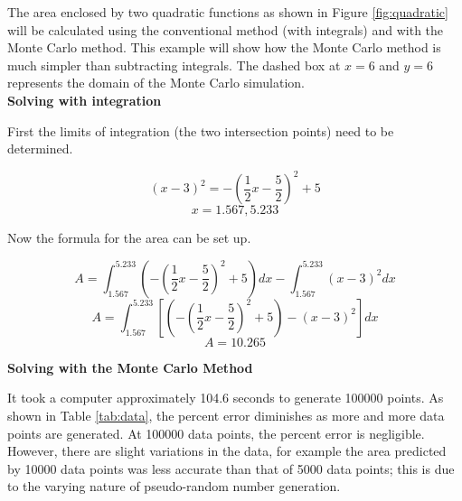 \documentclass[10pt, letterpaper]{article}
\begin{document}
  The area enclosed by two quadratic functions as shown in Figure \ref{fig:quadratic} will be calculated using the conventional method (with
  integrals) and with the Monte Carlo method. This example will show how the Monte Carlo method is much simpler than subtracting
  integrals. The dashed box at $x=6$ and $y=6$ represents the domain of the Monte Carlo simulation. \\

  \textbf{Solving with integration}

  First the limits of integration (the two intersection points) need to be determined.

  \[ (x-3)^2 = -\left(\frac{1}{2}x - \frac{5}{2} \right)^2 + 5 \]
  \[ x = 1.567, 5.233 \]

  Now the formula for the area can be set up.

  \[ A = \int_{1.567}^{5.233} \left( -\left(\frac{1}{2}x-\frac{5}{2} \right)^2 + 5 \right) dx - \int_{1.567}^{5.233} (x-3)^2 dx \]
  \[ A = \int_{1.567}^{5.233} [(-\left(\frac{1}{2}x-\frac{5}{2} \right)^2 + 5) - (x-3)^2]dx \]
  \[ \boxed{A = 10.265} \]

  \textbf{Solving with the Monte Carlo Method}

  It took a computer approximately 104.6 seconds to generate 100000 points. As shown in Table \ref{tab:data}, the percent error diminishes
  as more and more data points are generated. At 100000 data points, the percent error is negligible. However, there are slight variations
  in the data, for example the area predicted by 10000 data points was less accurate than that of 5000 data points; this is due to the
  varying nature of pseudo-random number generation.
\end{document}
